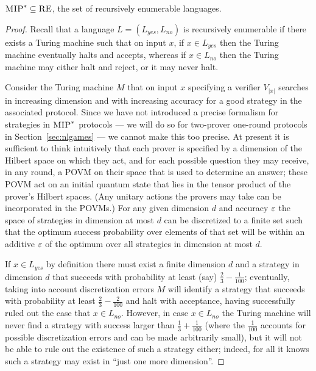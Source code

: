 \begin{lemma}\label{lem:mip-in-re}
$\textsc{MIP}^* \subseteq \textsc{RE}$, the set of recursively enumerable languages. 
\end{lemma} 

\begin{proof}
Recall that a language $L=(L_{yes},L_{no})$ is recursively enumerable if there exists a Turing machine such that on input $x$, if $x\in L_{yes}$ then the Turing machine eventually halts and accepts, whereas if $x\in L_{no}$ then the Turing machine may either halt and reject, or it may never halt. 

Consider the Turing machine $M$ that on input $x$ specifying a verifier $V_{|x|}$ searches in increasing dimension and with increasing accuracy for a good strategy in the associated protocol. Since we have not introduced a precise formalism for strategies in $\textsc{MIP}^*$ protocols --- we will do so for two-prover one-round protocols in Section~\ref{sec:nlgames} --- we cannot make this too precise. At present it is sufficient to think intuitively that each prover is specified by a dimension of the Hilbert space on which they act, and for each possible question they may receive, in any round, a POVM on their space that is used to determine an answer; these POVM act on an initial quantum state that lies in the tensor product of the prover's Hilbert spaces. (Any unitary actions the provers may take can be incorporated in the POVMs.) For any given dimension $d$ and accuracy $\varepsilon$ the space of strategies in dimension at most $d$ can be discretized to a finite set such that the optimum success probability over elements of that set will be within an additive $\varepsilon$ of the optimum over all strategies in dimension at most $d$. 

If $x\in L_{yes}$ by definition there must exist a finite dimension $d$ and a strategy in dimension $d$ that succeeds with probability at least (say) $\frac{2}{3}-\frac{1}{100}$; eventually, taking into account discretization errors $M$ will identify a strategy that succeeds with probability at least $\frac{2}{3}-\frac{2}{100}$ and halt with acceptance, having successfully ruled out the case that $x\in L_{no}$. However, in case $x\in L_{no}$ the Turing machine will never find a strategy with success larger than $\frac{1}{3} + \frac{1}{100}$ (where the $\frac{1}{100}$ accounts for possible discretization errors and can be made arbitrarily small), but it will not be able to rule out the existence of such a strategy either; indeed, for all it knows such a strategy may exist in ``just one more dimension''. 
\end{proof}

